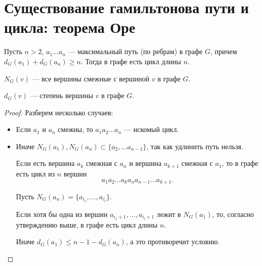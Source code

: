 \section{Существование гамильтонова пути и цикла: теорема Оре}

\begin{lemma}\label{lm:circle_1}
    Пусть $n > 2$, $a_1 \ldots a_n$ --- максимальный путь (по ребрам) в графе $G$, причем $d_{G}(a_1) + d_{G}(a_{n}) \ge n$. Тогда в графе есть цикл длины $n$.
\end{lemma}
$N_G(v)$ --- все вершины смежные с вершиной $v$ в графе $G$.

$d_G(v)$ --- степень вершины  $v$ в графе $G$.

\begin{proof}
	Разберем несколько случаев:
	\begin{itemize}
		\item Если $a_1$ и $a_{n}$ смежны, то $a_1a_2\ldots a_{n}$ --- искомый цикл.
		\item Иначе $N_{G}(a_1), N_{G}(a_{n}) \subset \{a_2, \ldots a_{n-1}\}$, так как удлинить путь нельзя.

			\begin{minipage}{0.6\textwidth}
				Если есть вершина $a_{k}$ смежная с $a_{n}$ и вершина $a_{k+1}$ смежная с $a_1$, то в графе есть цикл из $n$ вершин
					\[
					a_1a_2\ldots a_{k}a_{n}a_{n-1}\ldots a_{k+1}
					.\] 
			\end{minipage}
			\hfill
			\begin{minipage}{0.25\textwidth}
				\centering
				\label{fig:lm-circle}
			\end{minipage}
			Пусть $N_G(a_{n}) = \{a_{i_1}, \ldots , a_{i_l}\}$.

			Если хотя бы одна из вершин $a_{i_{1}+1}, \ldots , a_{i_{l}+1}$ лежит в $N_{G}(a_1)$, то, согласно утверждению выше, в графе есть цикл длины $n$. 

			Иначе $d_G(a_1) \le n-1 - d_G(a_n)$, а это противоречит условию.
	\end{itemize}
\end{proof}

